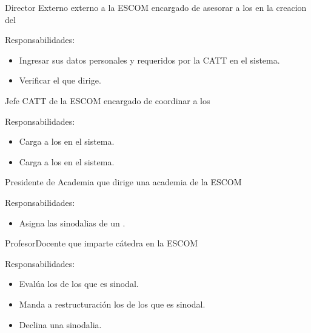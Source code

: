 \begin{actor}{Director Externo}{ externo a la ESCOM encargado de asesorar a los  en la creacion del } 
	\item[Responsabilidades:] \hspace{1pt}
	\begin{itemize}
		\item Ingresar sus datos personales y requeridos por la CATT en el sistema.
		\item Verificar el  que dirige.
	\end{itemize}
\end{actor}


\begin{actor}{Jefe CATT}{ de la ESCOM encargado de coordinar a los } 
	\item[Responsabilidades:] \hspace{1pt}
	\begin{itemize}
		\item Carga a los  en el sistema.
		\item Carga a los  en el sistema.
	\end{itemize}
\end{actor}


\begin{actor}{Presidente de Academia}{ que dirige una academia de la ESCOM} 
	\item[Responsabilidades:] \hspace{1pt}
	\begin{itemize}
		\item  Asigna las sinodalias de un .
	\end{itemize}
\end{actor}


\begin{actor}{Profesor}{Docente que imparte cátedra en la ESCOM} 
	\item[Responsabilidades:] \hspace{1pt}
	\begin{itemize}
		\item  Evalúa los  de los que es sinodal.
		\item  Manda a restructuración los  de los que es sinodal.
		\item  Declina una sinodalia.
	\end{itemize}
\end{actor}

